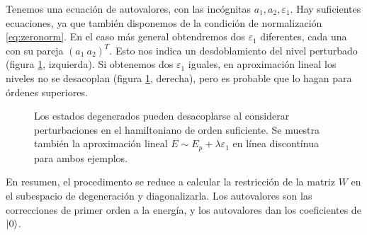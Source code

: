 Tenemos una ecuación de autovalores, con las incógnitas
$a_1,a_2,\varepsilon_1$. Hay suficientes ecuaciones, ya que también
disponemos de la condición de normalización \eqref{eq:zeronorm}. En el
caso más general obtendremos dos $\varepsilon_1$ diferentes, cada una con
su pareja $(a_1\ a_2)^T$. Esto nos indica un desdoblamiento del nivel
perturbado (figura \ref{fig:uncoupling}, izquierda). Si obtenemos dos
$\varepsilon_1$ iguales, en aproximación lineal los niveles no se
desacoplan (figura \ref{fig:uncoupling}, derecha), pero es probable
que lo hagan para órdenes superiores.

\begin{figure}
  \centering
  \caption{Los estados degenerados pueden desacoplarse al considerar
    perturbaciones en el hamiltoniano de orden suficiente. Se muestra también la
    aproximación lineal $E \sim E_p + \lambda \varepsilon_1$ en línea
    discontínua para ambos ejemplos.}
  \label{fig:uncoupling}
\end{figure}


En resumen, el procedimento se reduce a calcular la restricción de la
matriz $W$ en el subespacio de degeneración y diagonalizarla.
Los autovalores son las correcciones de primer orden a la energía, y
los autovalores dan los coeficientes de $\ket{0}$.

